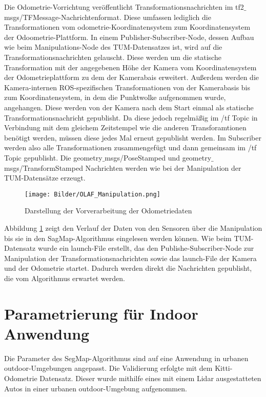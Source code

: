 Die Odometrie-Vorrichtung veröffentlicht Transformationsnachrichten im tf2$\_$msgs/TFMessage-Nachrichtenformat. Diese umfassen lediglich die  Transformationen vom odometrie-Koordinatensystem zum Koordinatensystem der Odoometrie-Plattform. In einem Publisher-Subscriber-Node, dessen Aufbau wie beim Manipulations-Node des TUM-Datensatzes ist, wird auf die Transformationsnachrichten gelauscht. Diese werden um die statische Transformation mit der angegebenen Höhe der Kamera vom Koordinatensystem der Odometrieplattform zu dem der Kamerabais erweitert. Außerdem werden die Kamera-internen ROS-spezifischen Transformationen von der Kamerabasis bis zum Koordinatensystem, in dem die Punktwolke aufgenommen wurde, angehangen. Diese werden von der Kamera nach dem Start  einmal als statische Transformationsnachricht gepublisht. Da diese jedoch regelmäßig im /tf Topic in Verbindung mit dem gleichem Zeitstempel wie die anderen Transforamtionen benötigt werden, müssen diese jedes Mal erneut gepublisht werden. Im Subscriber werden also alle Transformationen zusammengefügt und dann gemeinsam im /tf Topic gepublisht. Die geometry$\_$msgs/PoseStamped und geometry$\_$msgs/TransformStamped Nachrichten werden wie bei der Manipulation der TUM-Datensätze erzeugt. 

\begin{figure}
	\centering
	\texttt{[image: Bilder/OLAF\_Manipulation.png]}
	\caption{Darstellung der Vorverarbeitung der Odometriedaten}
	\label{fig:olaf_manipulation}
\end{figure}

Abbildung \ref{fig:olaf_manipulation} zeigt den Verlauf der Daten von den Sensoren über die Manipulation bis sie in den SagMap-Algorithmus eingelesen werden können. Wie beim TUM-Datensatz wurde ein launch-File erstellt, das den Publishe-Subscriber-Node zur Manipulation der Transformationsnachrichten sowie das launch-File der Kamera und der Odometrie startet. Dadurch werden direkt die Nachrichten gepublisht, die vom Algorithmus erwartet werden. 

\section{Parametrierung für Indoor Anwendung}

Die Parameter des SegMap-Algorithmus sind auf eine Anwendung in urbanen outdoor-Umgebungen angepasst. Die Validierung erfolgte mit dem Kitti-Odometrie Datensatz. Dieser wurde mithilfe eines mit einem Lidar ausgestatteten Autos in einer urbanen outdoor-Umgebung aufgenommen. 

